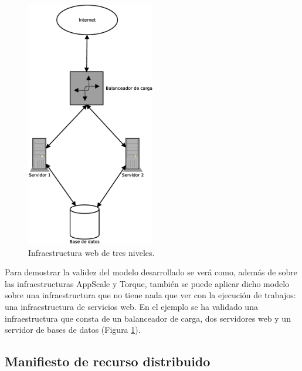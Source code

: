 \begin{figure} [!htbp]
  \centering
  \includegraphics[width=0.5\textwidth]{figuras/Arquitectura_web2.eps}
  \caption{Infraestructura web de tres niveles.}
\label{figure:arquitectura-web}
\end{figure}

Para demostrar la validez del modelo desarrollado se verá como, además de sobre las infraestructuras AppScale y Torque, también se puede aplicar dicho modelo sobre una infraestructura que no tiene nada que ver con la ejecución de trabajos: una infraestructura de servicios web. En el ejemplo se ha validado una infraestructura que consta de un balanceador de carga, dos servidores web y un servidor de bases de datos (Figura \ref{figure:arquitectura-web}).


\subsection{Manifiesto de recurso distribuido}

